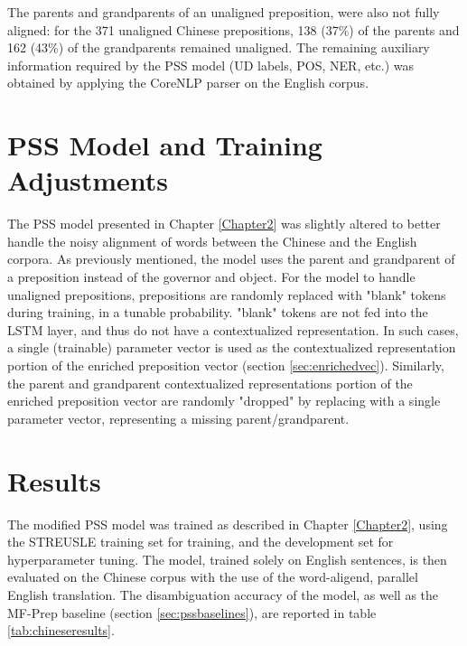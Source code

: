 The parents and grandparents of an unaligned preposition, were also not fully aligned: for the 371 unaligned Chinese prepositions, 138 (37\%) of the parents and 162 (43\%) of the grandparents remained unaligned. The remaining auxiliary information required by the PSS model (UD labels, POS, NER, etc.) was obtained by applying the CoreNLP parser on the English corpus. 

\section{PSS Model and Training Adjustments} \label{sec:pssmodelmod}

The PSS model presented in Chapter \ref{Chapter2} was slightly altered to better handle the noisy alignment of words between the Chinese and the English corpora. As previously mentioned, the model uses the parent and grandparent of a preposition instead of the governor and object. For the model to handle unaligned prepositions, prepositions are randomly replaced with "blank" tokens during training, in a tunable probability. "blank" tokens are not fed into the LSTM layer, and thus do not have a contextualized representation. In such cases, a single (trainable) parameter vector is used as the contextualized representation portion of the enriched preposition vector (section \ref{sec:enrichedvec}). Similarly, the parent and grandparent contextualized representations portion of the enriched preposition vector are randomly "dropped" by replacing with a single parameter vector, representing a missing parent/grandparent. 

\section{Results} 

The modified PSS model was trained as described in Chapter \ref{Chapter2}, using the STREUSLE training set for training, and the development set for hyperparameter tuning. The model, trained solely on English sentences, is then evaluated on the Chinese corpus with the use of the word-aligend, parallel English translation. The disambiguation accuracy of the model, as well as the MF-Prep baseline (section \ref{sec:pssbaselines}), are reported in table \ref{tab:chineseresults}.

